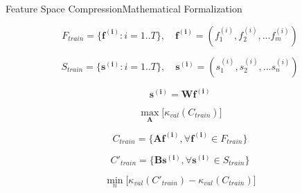 \documentclass{beamer}
\begin{document}
\begin{frame}{Feature Space Compression}{Mathematical Formalization}

		\begin{equation}
		F_{train} = \{\boldsymbol{f^{(i)}} : i = 1 .. T\}, \quad \boldsymbol{f^{(i)}} = (f^{(i)}_1, f^{(i)}_2, ... f^{(i)}_m)
		\end{equation}
		
		\begin{equation}
		S_{train} = \{\boldsymbol{s^{(i)}} : i = 1 .. T\}, \quad \boldsymbol{s^{(i)}} = (s^{(i)}_1, s^{(i)}_2, ... s^{(i)}_n)
		\end{equation}
		
		\begin{equation}
		\boldsymbol{s^{(i)}} = \boldsymbol{W} \boldsymbol{f^{(i)}}
		\end{equation}
		
		\begin{equation}
		\max_{\boldsymbol{A}} \big[ \kappa_{val} (C_{train}) \big]
		\end{equation}
		
		\begin{equation}
		C_{train} = \{ \boldsymbol{A} \boldsymbol{f^{(i)}}, \forall \boldsymbol{f^{(i)}} \in F_{train} \} 
		\end{equation}

		\begin{equation}
		C'_{train} = \{ \boldsymbol{B} \boldsymbol{s^{(i)}}, \forall \boldsymbol{s^{(i)}} \in S_{train} \} 
		\end{equation}
		
		\begin{equation}
		\min_{n} \big[ \kappa_{val} (C'_{train}) - \kappa_{val} (C_{train}) \big] 
		\end{equation}
\end{frame}
\end{document}
